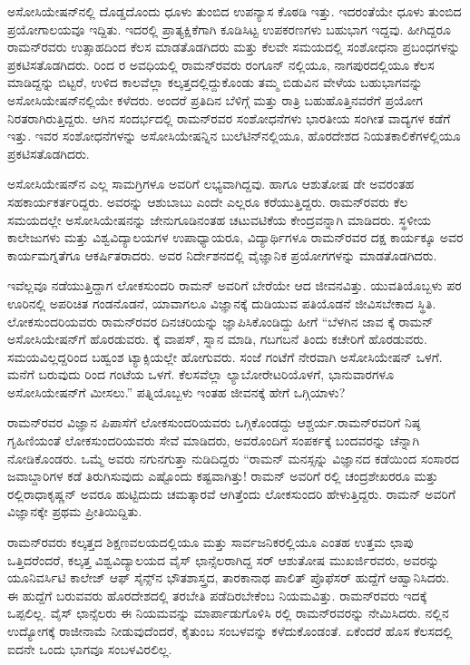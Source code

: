 ಅಸೋಸಿಯೇಷನ್‍ನಲ್ಲಿ ದೊಡ್ಡದೊಂದು ಧೂಳು ತುಂಬಿದ ಉಪನ್ಯಾಸ ಕೊಠಡಿ ಇತ್ತು. ಇದರಂತೆಯೇ ಧೂಳು ತುಂಬಿದ ಪ್ರಯೋಗಾಲಯವೂ ಇದ್ದಿತು. ಇದರಲ್ಲಿ ಪ್ರಾತ್ಯಕ್ಷಿಕೆಗಾಗಿ ಕೂಡಿಸಿಟ್ಟ ಉಪಕರಣಗಳು ಬಹುಭಾಗ ಇದ್ದವು. ಹೀಗಿದ್ದರೂ ರಾಮನ್‍ರವರು ಉತ್ಸಾಹದಿಂದ ಕೆಲಸ ಮಾಡತೊಡಗಿದರು ಮತ್ತು ಕೆಲವೇ ಸಮಯದಲ್ಲಿ ಸಂಶೋಧನಾ ಪ್ರಬಂಧಗಳನ್ನು ಪ್ರಕಟಿಸತೊಡಗಿದರು. ರಿಂದ ರ ಅವಧಿಯಲ್ಲಿ ರಾಮನ್‍ರವರು ರಂಗೂನ್ ನಲ್ಲಿಯೂ, ನಾಗಪುರದಲ್ಲಿಯೂ ಕೆಲಸ ಮಾಡಿದ್ದನ್ನು ಬಿಟ್ಟರೆ, ಉಳಿದ ಕಾಲವೆಲ್ಲಾ ಕಲ್ಕತ್ತದಲ್ಲಿದ್ದುಕೊಂಡು ತಮ್ಮ ಬಿಡುವಿನ ವೇಳೆಯ ಬಹುಭಾಗವನ್ನು ಅಸೋಸಿಯೇಷನ್‍ನಲ್ಲಿಯೇ ಕಳೆದರು. ಅಂದರೆ ಪ್ರತಿದಿನ ಬೆಳಿಗ್ಗೆ ಮತ್ತು ರಾತ್ರಿ ಬಹುಹೊತ್ತಿನವರೆಗೆ ಪ್ರಯೋಗ ನಿರತರಾಗಿರುತ್ತಿದ್ದರು. ಆಗಿನ ಸಂದರ್ಭದಲ್ಲಿ ರಾಮನ್‍ರವರ ಸಂಶೋಧನೆಗಳು ಭಾರತೀಯ ಸಂಗೀತ ವಾದ್ಯಗಳ ಕಡೆಗೆ ಇತ್ತು. ಇವರ ಸಂಶೋಧನೆಗಳನ್ನು ಅಸೋಸಿಯೇಷನ್ನಿನ ಬುಲೆಟಿನ್‍ನಲ್ಲಿಯೂ, ಹೊರದೇಶದ ನಿಯತಕಾಲಿಕೆಗಳಲ್ಲಿಯೂ ಪ್ರಕಟಿಸತೊಡಗಿದರು.

ಅಸೋಸಿಯೇಷನ್‍ನ ಎಲ್ಲ ಸಾಮಗ್ರಿಗಳೂ ಅವರಿಗೆ ಲಭ್ಯವಾಗಿದ್ದವು. ಹಾಗೂ ಆಶುತೋಷ ಡೇ ಅವರಂತಹ ಸಹಕಾರ್ಯಕರ್ತರಿದ್ದರು. ಅವರನ್ನು ಆಶುಬಾಬು ಎಂದೇ ಎಲ್ಲರೂ ಕರೆಯುತ್ತಿದ್ದರು. ರಾಮನ್‍ರವರು ಕೆಲ ಸಮಯದಲ್ಲೇ ಅಸೋಸಿಯೇಷನನ್ನು ಜೇನುಗೂಡಿನಂತಹ ಚಟುವಟಿಕೆಯ ಕೇಂದ್ರವನ್ನಾಗಿ ಮಾಡಿದರು. ಸ್ಥಳೀಯ ಕಾಲೇಜುಗಳು ಮತ್ತು ವಿಶ್ವವಿದ್ಯಾಲಯಗಳ ಉಪಾಧ್ಯಾಯರೂ, ವಿದ್ಯಾರ್ಥಿಗಳೂ ರಾಮನ್‍ರವರ ದಕ್ಷ ಕಾರ್ಯಕ್ಕೂ ಅವರ ಕಾರ್ಯಮಗ್ನತೆಗೂ ಆಕರ್ಷಿತರಾದರು. ಅವರ ನಿರ್ದೇಶನದಲ್ಲಿ ವೈಜ್ಞಾನಿಕ ಪ್ರಯೋಗಗಳನ್ನು ಮಾಡತೊಡಗಿದರು.

ಇವೆಲ್ಲವೂ ನಡೆಯುತ್ತಿದ್ದಾಗ ಲೋಕಸುಂದರಿ ರಾಮನ್ ಅವರಿಗೆ ಬೇರೆಯೇ ಆದ ಜೀವನವಿತ್ತು. ಯುವತಿಯೊಬ್ಬಳು ಪರ ಊರಿನಲ್ಲಿ ಅಪರಿಚಿತ ಗಂಡನೊಡನೆ, ಯಾವಾಗಲೂ ವಿಜ್ಞಾನಕ್ಕೆ ದುಡಿಯುವ ಪತಿಯೊಡನೆ ಜೀವಿಸಬೇಕಾದ ಸ್ಥಿತಿ. ಲೋಕಸುಂದರಿಯವರು ರಾಮನ್‍ರವರ ದಿನಚರಿಯನ್ನು ಜ್ಞಾಪಿಸಿಕೊಂಡಿದ್ದು ಹೀಗೆ\enginline{-} “ಬೆಳಗಿನ ಜಾವ  ಕ್ಕೆ ರಾಮನ್ ಅಸೋಸಿಯೇಷನ್‍ಗೆ ಹೊರಡುವರು. ಕ್ಕೆ ವಾಪಸ್, ಸ್ನಾನ ಮಾಡಿ, ಗಬಗಬನೆ ತಿಂದು ಕಚೇರಿಗೆ ಹೊರಡುವರು. ಸಮಯವಿಲ್ಲದ್ದರಿಂದ ಬಹ್ವಂಶ ಟ್ಯಾಕ್ಸಿಯಲ್ಲೇ ಹೋಗುವರು. ಸಂಜೆ  ಗಂಟೆಗೆ ನೇರವಾಗಿ ಅಸೋಸಿಯೇಷನ್ ಒಳಗೆ. ಮನೆಗೆ ಬರುವುದು  ರಿಂದ  ಗಂಟೆಯ ಒಳಗೆ. ಕೆಲಸವೆಲ್ಲಾ ಲ್ಯಾಬೋರೇಟರಿಯೊಳಗೆ, ಭಾನುವಾರಗಳೂ ಅಸೋಸಿಯೇಷನ್‍ಗೆ ಮೀಸಲು.” ಪತ್ನಿಯೊಬ್ಬಳು ಇಂತಹ ಜೀವನಕ್ಕೆ ಹೇಗೆ ಒಗ್ಗಿಯಾಳು?

ರಾಮನ್‍ರವರ ವಿಜ್ಞಾನ ಪಿಪಾಸೆಗೆ ಲೋಕಸುಂದರಿಯವರು ಒಗ್ಗಿಕೊಂಡದ್ದು ಆಶ್ಚರ್ಯ.\break ರಾಮನ್‍ರವರಿಗೆ ನಿಷ್ಠ ಗೃಹಿಣಿಯಂತೆ ಲೋಕಸುಂದರಿಯವರು ಸೇವೆ ಮಾಡಿದರು, ಅವರೊಂದಿಗೆ ಸಂಪರ್ಕಕ್ಕೆ ಬಂದವರನ್ನು ಚೆನ್ನಾಗಿ ನೋಡಿಕೊಂಡರು. ಒಮ್ಮೆ ಅವರು ನಗುನಗುತ್ತಾ ನುಡಿದಿದ್ದರು  “ರಾಮನ್ ಮನಸ್ಸನ್ನು ವಿಜ್ಞಾನದ ಕಡೆಯಿಂದ ಸಂಸಾರದ ಜವಾಬ್ದಾರಿಗಳ ಕಡೆ ತಿರುಗಿಸುವುದು ಎಷ್ಟೊಂದು ಕಷ್ಟವಾಗಿತ್ತು! ರಾಮನ್ ಅವರಿಗೆ ರಲ್ಲಿ ಚಂದ್ರಶೇಖರರೂ ಮತ್ತು ರಲ್ಲಿ\break ರಾಧಾಕೃಷ್ಣನ್ ಅವರೂ ಹುಟ್ಟಿದುದು ಚಮತ್ಕಾರವೆ ಆಗಿತ್ತೆಂದು ಲೋಕಸುಂದರಿ ಹೇಳುತ್ತಿದ್ದರು. ರಾಮನ್ ಅವರಿಗೆ ವಿಜ್ಞಾನಕ್ಕೇ ಪ್ರಥಮ ಪ್ರೀತಿಯಿದ್ದಿತು.



ರಾಮನ್‍ರವರು ಕಲ್ಕತ್ತದ ಶಿಕ್ಷಣವಲಯದಲ್ಲಿಯೂ ಮತ್ತು ಸಾರ್ವಜನಿಕರಲ್ಲಿಯೂ ಎಂತಹ ಉತ್ತಮ ಛಾಪು ಒತ್ತಿದರೆಂದರೆ, ಕಲ್ಕತ್ತ ವಿಶ್ವವಿದ್ಯಾಲಯದ ವೈಸ್ ಛಾನ್ಸೆಲರಾಗಿದ್ದ ಸರ್ ಆಶುತೋಷ ಮುಖರ್ಜಿರವರು, ಅವರನ್ನು ಯೂನಿವರ್ಸಿಟಿ ಕಾಲೇಜ್ ಆಫ್ ಸೈನ್ಸ್‌ನ ಭೌತಶಾಸ್ತ್ರದ, ತಾರಕಾನಾಥ ಪಾಲಿತ್ ಪ್ರೊಫೆಸರ್ ಹುದ್ದೆಗೆ ಆಹ್ವಾನಿಸಿದರು. ಈ ಹುದ್ದೆಗೆ ಬರುವವರು ಹೊರದೇಶದಲ್ಲಿ ತರಬೇತಿ ಪಡೆದಿರಬೇಕೆಂಬ ನಿಯಮವಿತ್ತು. ರಾಮನ್‍ರವರು ಇದಕ್ಕೆ ಒಪ್ಪಲಿಲ್ಲ. ವೈಸ್ ಛಾನ್ಸೆಲರು ಈ ನಿಯಮವನ್ನು ಮಾರ್ಪಾಡುಗೊಳಿಸಿ ರಲ್ಲಿ ರಾಮನ್‍ರವರನ್ನು ನೇಮಿಸಿದರು.  ನಲ್ಲಿನ ಉದ್ಯೋಗಕ್ಕೆ ರಾಜೀನಾಮೆ ನೀಡುವುದೆಂದರೆ, ಕೈತುಂಬ ಸಂಬಳವನ್ನು ಕಳೆದುಕೊಂಡಂತೆ. ಏಕೆಂದರೆ ಹೊಸ ಕೆಲಸದಲ್ಲಿ ಐದನೇ ಒಂದು ಭಾಗವೂ ಸಂಬಳವಿರಲಿಲ್ಲ.


